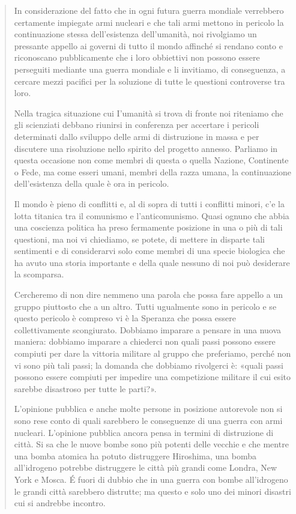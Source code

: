 \documentclass[a4paper, oneside]{article}
\newcounter{i}%
\newcounter{n}%
\newcounter{I}%
\begin{document}
\begin{quotation}
In considerazione del fatto che in ogni futura guerra mondiale verrebbero certamente impiegate armi nucleari e che tali armi mettono in pericolo la continuazione stessa dell'esistenza dell'umanità, noi rivolgiamo un pressante appello ai governi di tutto il mondo affinché si rendano conto e riconoscano pubblicamente che i loro obbiettivi non possono essere perseguiti mediante una guerra mondiale e li invitiamo, di conseguenza, a cercare mezzi pacifici per la soluzione di tutte le questioni controverse tra loro.

Nella tragica situazione cui I'umanità si trova di fronte noi riteniamo che gli scienziati debbano riunirsi in conferenza per accertare i pericoli determinati dallo sviluppo delle armi di distruzione in massa e per discutere una risoluzione nello spirito del progetto annesso. Parliamo in questa occasione non come membri di questa o quella Nazione, Continente o Fede, ma come esseri umani, membri della razza umana, la continuazione dell'esistenza della quale è ora in pericolo.

Il mondo è pieno di conflitti e, al di sopra di tutti i conflitti minori, c'e la lotta titanica tra il comunismo e l'anticomunismo. Quasi ognuno che abbia una coscienza politica ha preso fermamente posizione in una o più di tali questioni, ma noi vi chiediamo, se potete, di mettere in disparte tali sentimenti e di considerarvi solo come membri di una specie biologica che ha avuto una storia importante e della quale nessuno di noi può desiderare la scomparsa.

Cercheremo di non dire nemmeno una parola che possa fare appello a un gruppo piuttosto che a un altro. Tutti ugualmente sono in pericolo e se questo pericolo è compreso vi è la Speranza che possa essere collettivamente scongiurato. Dobbiamo imparare a pensare in una nuova maniera: dobbiamo imparare a chiederci non quali passi possono essere compiuti per dare la vittoria militare al gruppo che preferiamo, perché non vi sono più tali passi; la domanda che dobbiamo rivolgerci è: «quali passi possono essere compiuti per impedire una competizione militare il cui esito sarebbe disastroso per tutte le parti?».

L'opinione pubblica e anche molte persone in posizione autorevole non si sono rese conto di quali sarebbero le conseguenze di una guerra con armi nucleari. L'opinione pubblica ancora pensa in termini di distruzione di città. Si sa che le nuove bombe sono più potenti delle vecchie e che mentre una bomba atomica ha potuto distruggere Hiroshima, una bomba all'idrogeno potrebbe distruggere le città più grandi come Londra, New York e Mosca. É fuori di dubbio che in una guerra con bombe all'idrogeno le grandi città sarebbero distrutte; ma questo e solo uno dei minori disastri cui si andrebbe incontro.


\end{quotation}
\end{document}
